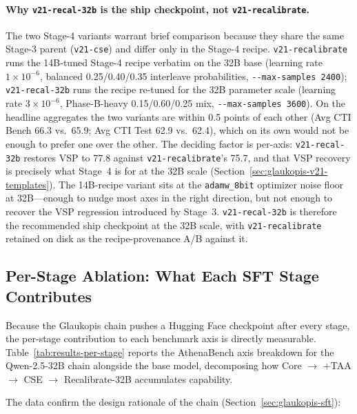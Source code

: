 \documentclass[conference]{IEEEtran}
\providecommand{\hfid}[1]{{\small\nolinkurl{#1}}}
\begin{document}
\paragraph{Why \texorpdfstring{\hfid{v21-recal-32b}}{v21-recal-32b} is the ship checkpoint, not \texorpdfstring{\hfid{v21-recalibrate}}{v21-recalibrate}.}
The two Stage-4 variants warrant brief comparison because they share the same Stage-3 parent (\hfid{v21-cse}) and differ only in the Stage-4 recipe. \hfid{v21-recalibrate} runs the 14B-tuned Stage-4 recipe verbatim on the 32B base (learning rate $1\times 10^{-6}$, balanced 0.25/0.40/0.35 interleave probabilities, \hfid{--max-samples 2400}); \hfid{v21-recal-32b} runs the recipe re-tuned for the 32B parameter scale (learning rate $3\times 10^{-6}$, Phase-B-heavy 0.15/0.60/0.25 mix, \hfid{--max-samples 3600}). On the headline aggregates the two variants are within 0.5 points of each other (Avg CTI Bench 66.3 vs.\ 65.9; Avg CTI Test 62.9 vs.\ 62.4), which on its own would not be enough to prefer one over the other. The deciding factor is per-axis: \hfid{v21-recal-32b} restores VSP to 77.8 against \hfid{v21-recalibrate}'s 75.7, and that VSP recovery is precisely what Stage~4 is for at the 32B scale (Section~\ref{sec:glaukopis-v21-templates}). The 14B-recipe variant sits at the \hfid{adamw_8bit} optimizer noise floor at 32B---enough to nudge most axes in the right direction, but not enough to recover the VSP regression introduced by Stage~3. \hfid{v21-recal-32b} is therefore the recommended ship checkpoint at the 32B scale, with \hfid{v21-recalibrate} retained on disk as the recipe-provenance A/B against it.

\subsection{Per-Stage Ablation: What Each SFT Stage Contributes}
\label{sec:results-per-stage}

Because the Glaukopis chain pushes a Hugging Face checkpoint after every stage, the per-stage contribution to each benchmark axis is directly measurable. Table~\ref{tab:results-per-stage} reports the AthenaBench axis breakdown for the Qwen-2.5-32B chain alongside the base model, decomposing how Core $\to$ +TAA $\to$ CSE $\to$ Recalibrate-32B accumulates capability.

The data confirm the design rationale of the chain (Section~\ref{sec:glaukopis-sft}):
\end{document}
